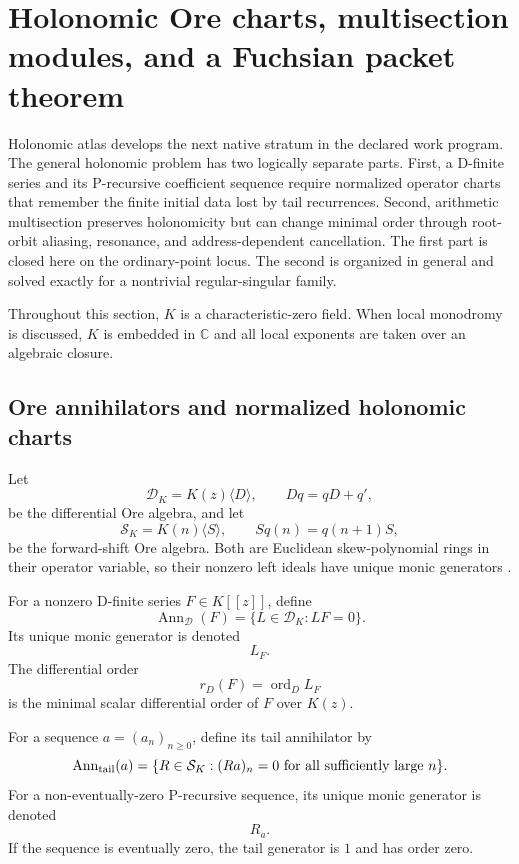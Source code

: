 \section{Holonomic Ore charts, multisection modules, and a Fuchsian packet theorem}
\label{sec:block09-holonomic}

Holonomic atlas develops the next native stratum in the declared work program.  The general holonomic problem has two logically separate parts.  First, a D-finite series and its P-recursive coefficient sequence require normalized operator charts that remember the finite initial data lost by tail recurrences.  Second, arithmetic multisection preserves holonomicity but can change minimal order through root-orbit aliasing, resonance, and address-dependent cancellation.  The first part is closed here on the ordinary-point locus.  The second is organized in general and solved exactly for a nontrivial regular-singular family.

Throughout this section, $K$ is a characteristic-zero field.  When local monodromy is discussed, $K$ is embedded in $\mathbb C$ and all local exponents are taken over an algebraic closure.

\subsection{Ore annihilators and normalized holonomic charts}
\label{subsec:block09-ore}

Let
\[
 \mathcal D_K=K(z)\langle D\rangle,
 \qquad
 Dq=qD+q',
\]
be the differential Ore algebra, and let
\[
 \mathcal S_K=K(n)\langle S\rangle,
 \qquad
 Sq(n)=q(n+1)S,
\]
be the forward-shift Ore algebra.  Both are Euclidean skew-polynomial rings in their operator variable, so their nonzero left ideals have unique monic generators \cite{Ore1933}.

\begin{definition}
For a nonzero D-finite series $F\in K[[z]]$, define
\[
 \operatorname{Ann}_{\mathcal D}(F)
 =
 \{L\in\mathcal D_K:LF=0\}.
\]
Its unique monic generator is denoted
\[
 \boxed{L_F.}
\]
The differential order
\[
 r_D(F)=\operatorname{ord}_D L_F
\]
is the minimal scalar differential order of $F$ over $K(z)$.
\end{definition}

\begin{definition}
For a sequence $a=(a_n)_{n\geq0}$, define its tail annihilator by
\[
 \operatorname{Ann}_{\rm tail}(a)
 =
 \{R\in\mathcal S_K:(Ra)_n=0\text{ for all sufficiently large }n\}.
\]
For a non-eventually-zero P-recursive sequence, its unique monic generator is denoted
\[
 \boxed{R_a.}
\]
If the sequence is eventually zero, the tail generator is $1$ and has order zero.
\end{definition}

